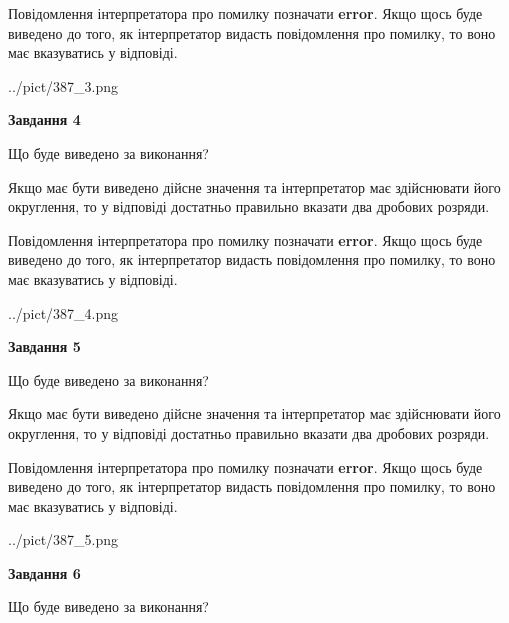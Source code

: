 \documentclass[12pt, ukrainian]{article}
\begin{document}
{\begin {Large}
Повідомлення інтерпретатора про помилку позначати \textbf{error}.
Якщо щось буде виведено до того, як інтерпретатор видасть повідомлення про помилку, 
то воно має вказуватись у відповіді. \par

\begin{center}
	{../pict/387_3.png}
\end{center}
\newpage

{\begin {center}\textbf{Завдання 4}\end {center}}\par
Що буде виведено за виконання? \par

Якщо має бути виведено дійсне значення та інтерпретатор має здійснювати його округлення, 
то у відповіді достатньо правильно вказати два дробових розряди.

Повідомлення інтерпретатора про помилку позначати \textbf{error}.
Якщо щось буде виведено до того, як інтерпретатор видасть повідомлення про помилку, 
то воно має вказуватись у відповіді. \par

\begin{center}
	{../pict/387_4.png}
\end{center}
\newpage

{\begin {center}\textbf{Завдання 5}\end {center}}\par
Що буде виведено за виконання? \par

Якщо має бути виведено дійсне значення та інтерпретатор має здійснювати його округлення, 
то у відповіді достатньо правильно вказати два дробових розряди.

Повідомлення інтерпретатора про помилку позначати \textbf{error}.
Якщо щось буде виведено до того, як інтерпретатор видасть повідомлення про помилку, 
то воно має вказуватись у відповіді. \par

\begin{center}
	{../pict/387_5.png}
\end{center}
\newpage

{\begin {center}\textbf{Завдання 6}\end {center}}\par
Що буде виведено за виконання? \par


\end{Large}}
\end{document}
